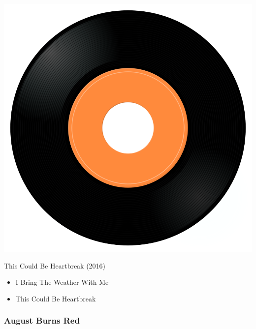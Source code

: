 \begin{minipage}[t]{0.25\textwidth}\vspace{0pt}
\captionsetup{type=figure}
\includegraphics[width=\textwidth]{Images/cover.png}
\caption*{This Could Be Heartbreak (2016)}
\end{minipage}
\begin{minipage}[t]{0.25\textwidth}\vspace{0pt}
\begin{itemize}[nosep,leftmargin=1em,labelwidth=*,align=left]
	\setlength{\itemsep}{0pt}
	\item I Bring The Weather With Me
	\item This Could Be Heartbreak
\end{itemize}
\end{minipage}

\subsubsection{August Burns Red}


